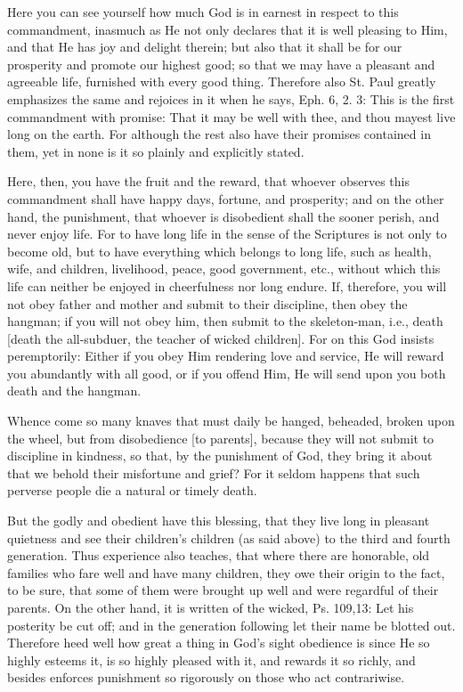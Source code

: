 Here you can see yourself how much God is in earnest in respect to this
commandment, inasmuch as He not only declares that it is well pleasing
to Him, and that He has joy and delight therein; but also that it shall
be for our prosperity and promote our highest good; so that we may have
a pleasant and agreeable life, furnished with every good thing.
Therefore also St. Paul greatly emphasizes the same and rejoices in it
when he says, Eph. 6, 2. 3: This is the first commandment with promise:
That it may be well with thee, and thou mayest live long on the earth.
For although the rest also have their promises contained in them, yet
in none is it so plainly and explicitly stated.

Here, then, you have the fruit and the reward, that whoever observes
this commandment shall have happy days, fortune, and prosperity; and on
the other hand, the punishment, that whoever is disobedient shall the
sooner perish, and never enjoy life. For to have long life in the sense
of the Scriptures is not only to become old, but to have everything
which belongs to long life, such as health, wife, and children,
livelihood, peace, good government, etc., without which this life can
neither be enjoyed in cheerfulness nor long endure. If, therefore, you
will not obey father and mother and submit to their discipline, then
obey the hangman; if you will not obey him, then submit to the
skeleton-man, i.e., death [death the all-subduer, the teacher of
wicked children]. For on this God insists peremptorily: Either if you
obey Him rendering love and service, He will reward you abundantly with
all good, or if you offend Him, He will send upon you both death and
the hangman.

Whence come so many knaves that must daily be hanged, beheaded, broken
upon the wheel, but from disobedience [to parents], because they will
not submit to discipline in kindness, so that, by the punishment of
God, they bring it about that we behold their misfortune and grief? For
it seldom happens that such perverse people die a natural or timely
death.

But the godly and obedient have this blessing, that they live long in
pleasant quietness and see their children's children (as said above) to
the third and fourth generation. Thus experience also teaches, that
where there are honorable, old families who fare well and have many
children, they owe their origin to the fact, to be sure, that some of
them were brought up well and were regardful of their parents. On the
other hand, it is written of the wicked, Ps. 109,13: Let his posterity
be cut off; and in the generation following let their name be blotted
out. Therefore heed well how great a thing in God's sight obedience is
since He so highly esteems it, is so highly pleased with it, and
rewards it so richly, and besides enforces punishment so rigorously on
those who act contrariwise.

